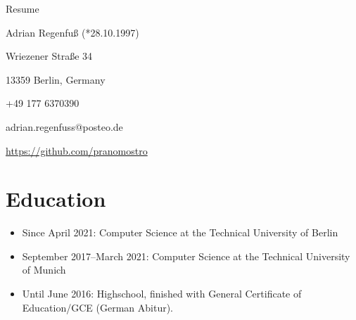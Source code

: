 \documentclass[11pt,a4paper]{article}
\begin{document}
\thispagestyle{empty}
\pagestyle{empty}

{\bf\centerline{{\huge Resume}}}
\vspace{6pt}

\centerline{Adrian Regenfuß (*28.10.1997)}
\centerline{Wriezener Straße 34}
\centerline{13359 Berlin, Germany}
\centerline{+49 177 6370390}
\centerline{adrian.regenfuss@posteo.de}
\centerline{\url{https://github.com/pranomostro}}

\section*{Education}
\begin{itemize}
	\setlength{\itemsep}{-2pt}
	\item Since April 2021: Computer Science at the Technical University of Berlin
	\item September 2017–March 2021: Computer Science at the Technical University of Munich
	\item Until June 2016: Highschool, finished with General Certificate of Education/GCE (German Abitur).
\end{itemize}
\end{document}
